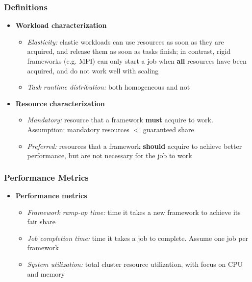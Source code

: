 \begin{frame}
\frametitle{Definitions}
\begin{itemize}
	\item {\bf Workload characterization}
	\begin{itemize}
		\item {\it Elasticity:} elastic workloads can use resources as soon as they are acquired, and release them as soon as tasks finish; in contrast, rigid frameworks (e.g. MPI) can only start a job when {\bf all} resources have been acquired, and do not work well with scaling
		\item {\it Task runtime distribution:} both homogeneous and not
	\end{itemize}

\vspace{20pt}

	\item {\bf Resource characterization}
	\begin{itemize}
		\item {\it Mandatory:} resource that a framework {\bf must} acquire to work. Assumption: mandatory resources $<$ guaranteed share
		\item {\it Preferred:} resources that a framework {\bf should} acquire to achieve better performance, but are not necessary for the job to work
	\end{itemize}
\end{itemize}
\end{frame}

\begin{frame}
\frametitle{Performance Metrics}
\begin{itemize}
	\item {\bf Performance metrics}
	\begin{itemize}
		\item {\it Framework ramp-up time:} time it takes a new framework to achieve its fair share
		\item {\it Job completion time:} time it takes a job to complete. Assume one job per framework
		\item {\it System utilization:} total cluster resource utilization, with focus on CPU and memory
	\end{itemize}
\end{itemize}
\end{frame}


